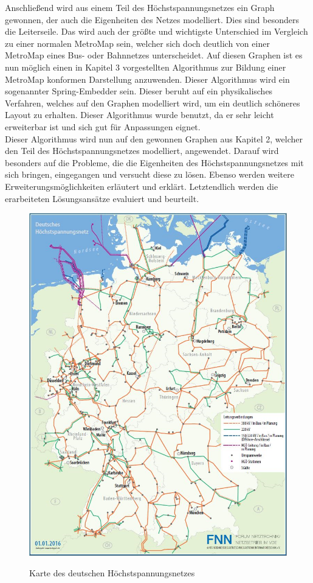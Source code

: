 Anschließend wird aus einem Teil des Höchstspannungsnetzes ein Graph gewonnen, der auch die Eigenheiten des Netzes modelliert. Dies sind besonders die Leiterseile. Das wird auch der größte und wichtigste Unterschied im Vergleich zu einer normalen MetroMap sein, welcher sich doch deutlich von einer MetroMap eines Bus- oder Bahnnetzes unterscheidet. Auf diesen Graphen ist es nun möglich einen in Kapitel 3 vorgestellten Algorithmus zur Bildung einer MetroMap konformen Darstellung anzuwenden. Dieser Algorithmus wird ein sogenannter Spring-Embedder sein. Dieser beruht auf ein physikalisches Verfahren, welches auf den Graphen modelliert wird, um ein deutlich schöneres Layout zu erhalten. Dieser Algorithmus wurde benutzt, da er sehr leicht erweiterbar ist und sich gut für Anpassungen eignet.\\

Dieser Algorithmus wird nun auf den gewonnen Graphen aus Kapitel 2, welcher den Teil des Höchstspannungsnetzes modelliert, angewendet. Darauf wird besonders auf die Probleme, die die Eigenheiten des Höchstspannungsnetzes mit sich bringen, eingegangen und versucht diese zu lösen. Ebenso werden weitere Erweiterungsmöglichkeiten erläutert und erklärt. Letztendlich werden die erarbeiteten Lösungsansätze evaluiert und beurteilt.
\begin{figure}[t]
	\centering
	{\includegraphics[scale=0.5]{bilder/hochstspannungsnetz}\label{fig_hochstspannungsnetz}
	}\\
	\caption[Karte des deutschen Höchstspannungsnetzes]{Karte des deutschen Höchstspannungsnetzes}
	\label{fig_hochstspannungsnetz2}
\end{figure}

